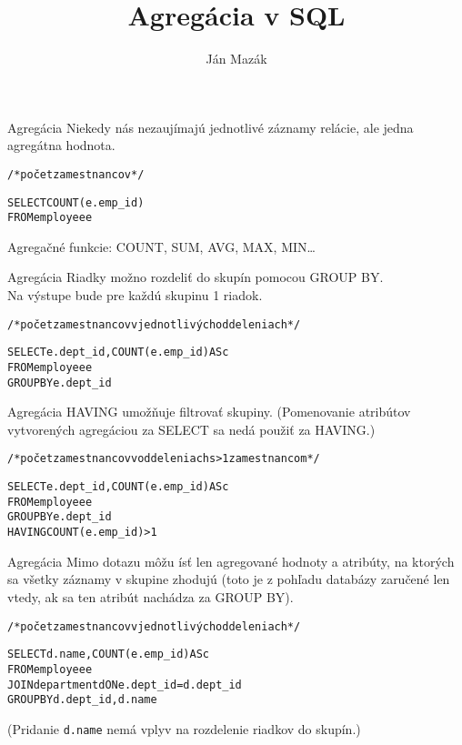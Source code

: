\documentclass[12pt]{beamer}
\title{Agregácia v SQL}
\author{Ján Mazák}
\institute{FMFI UK Bratislava}
\date{}
\def\blue#1{\textcolor{Cerulean}{#1}}
\begin{document}
\frame{\titlepage}



\begin{frame}[fragile]{Agregácia}
Niekedy nás nezaujímajú jednotlivé záznamy relácie, ale jedna agregátna hodnota.
\begin{alltt}
/* počet zamestnancov */

SELECT \alert{COUNT}(e.emp_id)
FROM employee e
\end{alltt}
Agregačné funkcie: COUNT, SUM, AVG, MAX, MIN\dots
\end{frame}

\begin{frame}[fragile]{Agregácia}
Riadky možno rozdeliť do skupín pomocou \alert{GROUP BY}.\\
Na výstupe bude pre každú skupinu 1 riadok.
\begin{alltt}
/* počet zamestnancov v jednotlivých oddeleniach */

SELECT e.dept_id, \alert{COUNT}(e.emp_id) AS c
FROM employee e
\alert{GROUP BY} e.dept_id
\end{alltt}
\end{frame}

\begin{frame}[fragile]{Agregácia}
\blue{HAVING} umožňuje filtrovať skupiny.
(Pomenovanie atribútov vytvorených agregáciou za SELECT sa nedá použiť za \blue{HAVING}.)
{
\small
\begin{alltt}
/* počet zamestnancov v oddeleniach s > 1 zamestnancom */
\end{alltt}
}
\begin{alltt}
SELECT e.dept_id, \alert{COUNT}(e.emp_id) AS c
FROM employee e
\alert{GROUP BY} e.dept_id
\blue{HAVING} COUNT(e.emp_id) > 1
\end{alltt}
\bigskip
\end{frame}

\begin{frame}[fragile]{Agregácia}
Mimo dotazu môžu ísť len agregované hodnoty a atribúty, na ktorých sa všetky záznamy v skupine zhodujú
(toto je z pohľadu databázy zaručené len vtedy, ak sa ten atribút nachádza za GROUP BY).
\begin{alltt}
/* počet zamestnancov v jednotlivých oddeleniach */

SELECT \blue{d.name}, \alert{COUNT}(e.emp_id) AS c
FROM employee e
    JOIN department d ON e.dept_id = d.dept_id
\alert{GROUP BY} d.dept_id, \blue{d.name}
\end{alltt}
(Pridanie \verb|d.name| nemá vplyv na rozdelenie riadkov do skupín.)
\end{frame}
\end{document}
